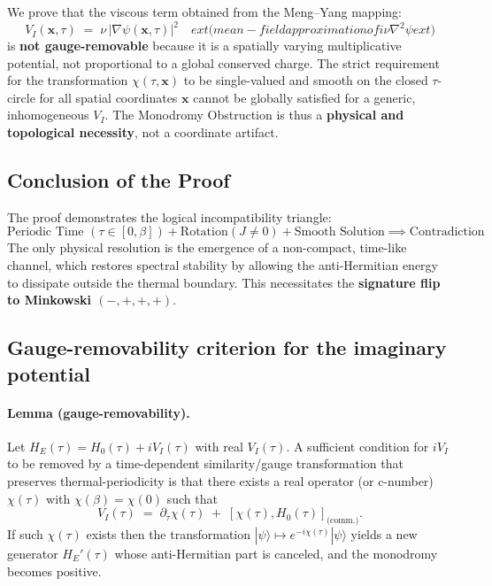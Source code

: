 \documentclass[11pt]{article}
\begin{document}
We prove that the viscous term obtained from the Meng--Yang mapping:
\[
        V_I(\mathbf x,\tau) \;=\; \nu\,|\nabla\psi(\mathbf x,\tau)|^2 \quad 	ext{(mean-field approximation of } i\nu\nabla^2\psi 	ext{)}
\]
is \textbf{not gauge-removable} because it is a spatially varying multiplicative potential, not proportional to a global conserved charge. The strict requirement for the transformation $\chi(\tau, \mathbf{x})$ to be single-valued and smooth on the closed $\tau$-circle for all spatial coordinates $\mathbf{x}$ cannot be globally satisfied for a generic, inhomogeneous $V_I$. The Monodromy Obstruction is thus a \textbf{physical and topological necessity}, not a coordinate artifact.

\subsection{Conclusion of the Proof}

The proof demonstrates the logical incompatibility triangle:
\[
    \text{Periodic Time } (\tau \in [0,\beta]) + \text{Rotation} (J \neq 0) + \text{Smooth Solution} \implies \text{Contradiction}
\]
The only physical resolution is the emergence of a non-compact, time-like channel, which restores spectral stability by allowing the anti-Hermitian energy to dissipate outside the thermal boundary. This necessitates the \textbf{signature flip to Minkowski $(-,+,+,+)$}.


\subsection*{Gauge-removability criterion for the imaginary potential}

\paragraph{Lemma (gauge-removability).}
Let \(H_E(\tau)=H_0(\tau)+iV_I(\tau)\) with real \(V_I(\tau)\). A sufficient condition for \(iV_I\) to be removed by a time-dependent similarity/gauge transformation that preserves thermal-periodicity is that there exists a real operator (or c-number) \(\chi(\tau)\) with \(\chi(\beta)=\chi(0)\) such that
\[
V_I(\tau) \;=\; \partial_\tau\chi(\tau) \;+\; [\chi(\tau),H_0(\tau)]_{\text{(comm.)}}.
\]
If such \(\chi(\tau)\) exists then the transformation \(|\psi\rangle\mapsto e^{-i\chi(\tau)}|\psi\rangle\) yields a new generator \(H_E'(\tau)\) whose anti-Hermitian part is canceled, and the monodromy becomes positive.
\end{document}
